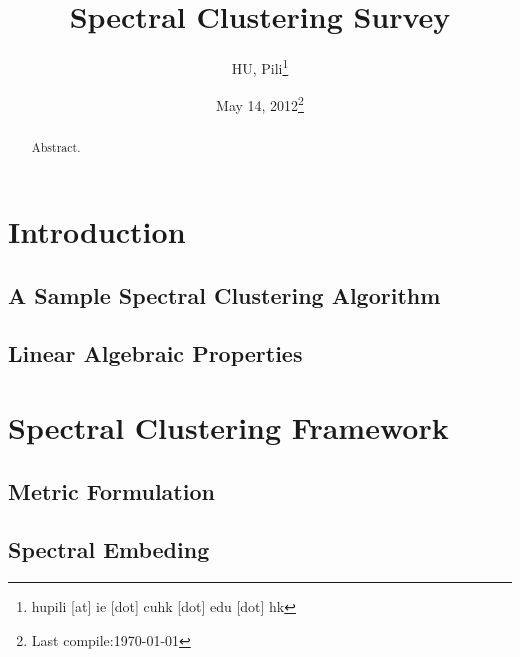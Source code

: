 


\author{HU, Pili\thanks{hupili [at] ie [dot] cuhk [dot] edu [dot] hk}}

\title{Spectral Clustering Survey}
\date{May 14, 2012\thanks{Last compile:\today}}



\maketitle
\begin{abstract}
	Abstract. 
\end{abstract}

\pagebreak
\setcounter{tocdepth}{2}
\tableofcontents
\pagebreak



\section{Introduction}
\label{sec:introduction}

\subsection{A Sample Spectral Clustering Algorithm}

\subsection{Linear Algebraic Properties}

\section{Spectral Clustering Framework}

\subsection{Metric Formulation}

\subsection{Spectral Embeding}

